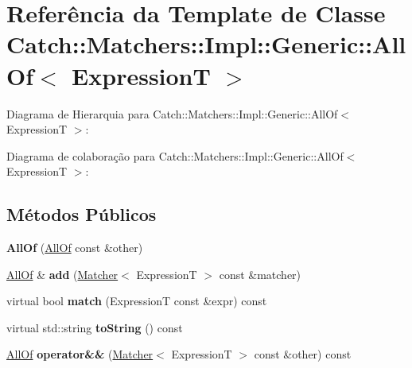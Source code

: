 \hypertarget{classCatch_1_1Matchers_1_1Impl_1_1Generic_1_1AllOf}{}\section{Referência da Template de Classe Catch\+:\+:Matchers\+:\+:Impl\+:\+:Generic\+:\+:All\+Of$<$ ExpressionT $>$}
\label{classCatch_1_1Matchers_1_1Impl_1_1Generic_1_1AllOf}


Diagrama de Hierarquia para Catch\+:\+:Matchers\+:\+:Impl\+:\+:Generic\+:\+:All\+Of$<$ ExpressionT $>$\+:


Diagrama de colaboração para Catch\+:\+:Matchers\+:\+:Impl\+:\+:Generic\+:\+:All\+Of$<$ ExpressionT $>$\+:
\subsection*{Métodos Públicos}
\begin{DoxyCompactItemize}
\item 
{\bfseries All\+Of} (\hyperlink{classCatch_1_1Matchers_1_1Impl_1_1Generic_1_1AllOf}{All\+Of} const \&other)\hypertarget{classCatch_1_1Matchers_1_1Impl_1_1Generic_1_1AllOf_a31f7c5e570e79bdf64064ee87c331a59}{}\label{classCatch_1_1Matchers_1_1Impl_1_1Generic_1_1AllOf_a31f7c5e570e79bdf64064ee87c331a59}

\item 
\hyperlink{classCatch_1_1Matchers_1_1Impl_1_1Generic_1_1AllOf}{All\+Of} \& {\bfseries add} (\hyperlink{structCatch_1_1Matchers_1_1Impl_1_1Matcher}{Matcher}$<$ ExpressionT $>$ const \&matcher)\hypertarget{classCatch_1_1Matchers_1_1Impl_1_1Generic_1_1AllOf_a8c5cd1e494ab697076da418ee72ac297}{}\label{classCatch_1_1Matchers_1_1Impl_1_1Generic_1_1AllOf_a8c5cd1e494ab697076da418ee72ac297}

\item 
virtual bool {\bfseries match} (ExpressionT const \&expr) const \hypertarget{classCatch_1_1Matchers_1_1Impl_1_1Generic_1_1AllOf_a04534d0ac9e089f4500c3c19054f11ce}{}\label{classCatch_1_1Matchers_1_1Impl_1_1Generic_1_1AllOf_a04534d0ac9e089f4500c3c19054f11ce}

\item 
virtual std\+::string {\bfseries to\+String} () const \hypertarget{classCatch_1_1Matchers_1_1Impl_1_1Generic_1_1AllOf_a9febc1e67acbeff62a32bcbfdc0c8fab}{}\label{classCatch_1_1Matchers_1_1Impl_1_1Generic_1_1AllOf_a9febc1e67acbeff62a32bcbfdc0c8fab}

\item 
\hyperlink{classCatch_1_1Matchers_1_1Impl_1_1Generic_1_1AllOf}{All\+Of} {\bfseries operator\&\&} (\hyperlink{structCatch_1_1Matchers_1_1Impl_1_1Matcher}{Matcher}$<$ ExpressionT $>$ const \&other) const \hypertarget{classCatch_1_1Matchers_1_1Impl_1_1Generic_1_1AllOf_ac2b4045ae39746852a0f603715ba1387}{}\label{classCatch_1_1Matchers_1_1Impl_1_1Generic_1_1AllOf_ac2b4045ae39746852a0f603715ba1387}

\end{DoxyCompactItemize}
